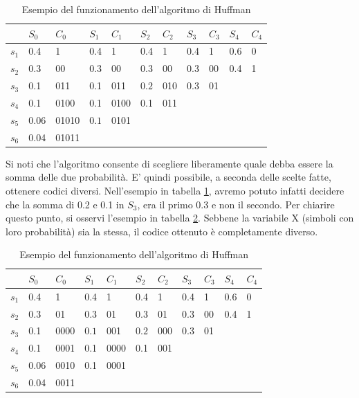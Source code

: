 \begin{table}[htbp]
  \begin{center}
   \begin{tabular}{l|| l|l|| l|l|| l|l|| l|l|| l|l}
	 & $S_0$ & $C_0$  & $S_1$ & $C_1$  & $S_2$ & $C_2$  & $S_3$ & $C_3$  & $S_4$ & $C_4$\\
       \hline
	$s_1$ & 0.4 & 1     & 0.4 & 1     & 0.4 & 1   & 0.4 & 1 & $ \boxed{0.6}$ & 0  \\ 
	$s_2$ & 0.3 & 00    & 0.3 & 00    & 0.3 & 00  & 0.3 & 00 & 0.4 & 1 \\ 
	$s_3$ & 0.1 & 011   & 0.1 & 011   & $\boxed{0.2}$ & 010 & $\boxed{0.3}$ & 01 & &\\ 
        $s_4$ & 0.1 & 0100  & 0.1 & 0100  & 0.1 & 011 & & & & \\ 
        $s_5$ & 0.06 & 01010 & $\boxed{0.1}$ & 0101 & & & & &\\ 
        $s_6$ & 0.04 & 01011 & & & & & & &\\ 
    \end{tabular}
     
     \caption{Esempio del funzionamento dell'algoritmo di Huffman}
    \label{tab:huffman1}
  \end{center}
\end{table}

Si noti che l'algoritmo consente di scegliere liberamente quale debba essere la somma delle due probabilità.
E' quindi possibile, a seconda delle scelte fatte, ottenere codici diversi.
Nell'esempio in tabella \ref{tab:huffman1}, avremo potuto infatti decidere che la somma di 0.2 e 0.1 in $S_3$, era il primo
0.3 e non il secondo. Per chiarire questo punto, si osservi l'esempio in tabella \ref{tab:huffman2}. Sebbene la variabile X 
(simboli con loro probabilità) sia la stessa, il codice ottenuto è completamente diverso.

\begin{table}[htbp]
  \begin{center}
   \begin{tabular}{l|| l|l|| l|l|| l|l|| l|l|| l|l}
	 & $S_0$ & $C_0$  & $S_1$ & $C_1$  & $S_2$ & $C_2$  & $S_3$ & $C_3$  & $S_4$ & $C_4$\\
       \hline
	$s_1$ & 0.4 & 1     & 0.4 & 1     & 0.4 & 1   & 0.4 & 1 & $ \boxed{0.6}$ & 0  \\ 
	$s_2$ & 0.3 & 01    & 0.3 & 01    & 0.3 & 01  & $\boxed{0.3}$ & 00 &           0.4 & 1 \\ 
	$s_3$ & 0.1 & 0000   & $\boxed{0.1}$ & 001   & $\boxed{0.2}$ & 000 & 0.3 & 01 & &\\ 
        $s_4$ & 0.1 & 0001  & 0.1 & 0000  & 0.1 & 001 & & & & \\ 
        $s_5$ & 0.06 & 0010 & 0.1 & 0001 & & & & &\\ 
        $s_6$ & 0.04 & 0011 & & & & & & &\\ 
    \end{tabular}
     
     \caption{Esempio del funzionamento dell'algoritmo di Huffman}
    \label{tab:huffman2}
  \end{center}
\end{table}

